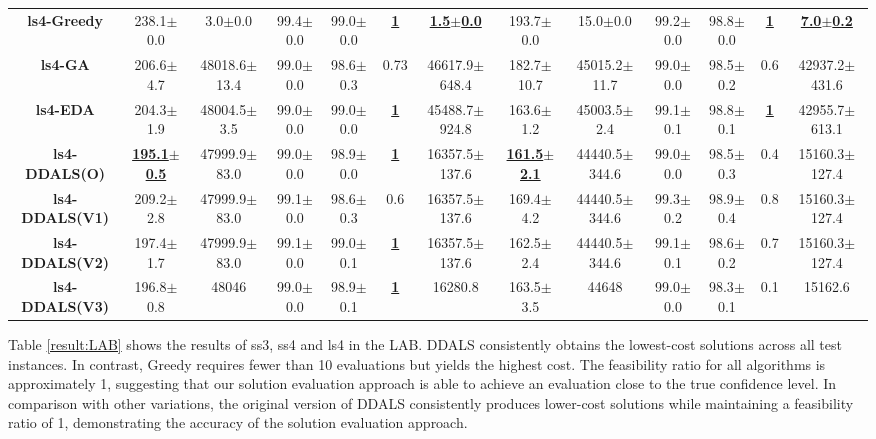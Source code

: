 \documentclass[lettersize,journal]{IEEEtran}
\begin{document}
\begin{table}[!t]
{\begin{tabular}{ccccccccccccc}
        \midrule
        {\bfseries ls4-Greedy} &238.1$\pm$0.0 &3.0$\pm$0.0 & 99.4$\pm$0.0 &99.0$\pm$0.0 &\underline{\bfseries 1} &\underline{\bfseries 1.5$\pm$0.0} &193.7$\pm$0.0 &15.0$\pm$0.0& 99.2$\pm$0.0&98.8$\pm$0.0  &\underline{\bfseries 1} &\underline{\bfseries 7.0$\pm$0.2} \\
        {\bfseries ls4-GA} &206.6$\pm$4.7 &48018.6$\pm$13.4 & 99.0$\pm$0.0 &98.6$\pm$0.3 &0.73 &46617.9$\pm$648.4 &182.7$\pm$10.7 &45015.2$\pm$11.7 & 99.0$\pm$0.0 &98.5$\pm$0.2 &0.6 &42937.2$\pm$431.6 \\
        {\bfseries ls4-EDA} &204.3$\pm$1.9 &48004.5$\pm$3.5 & 99.0$\pm$0.0 &99.0$\pm$0.0 &\underline{\bfseries 1} &45488.7$\pm$924.8 &163.6$\pm$1.2 &45003.5$\pm$2.4 & 99.1$\pm$0.1 &98.8$\pm$0.1  &\underline{\bfseries 1} &42955.7$\pm$613.1 \\
        {\bfseries ls4-DDALS(O)} &\underline{\bfseries 195.1$\pm$0.5} &47999.9$\pm$83.0 &99.0$\pm$0.0 &98.9$\pm$0.0 &\underline{\bfseries 1} &16357.5$\pm$137.6 &\underline{\bfseries 161.5$\pm$2.1} &44440.5$\pm$344.6 & 99.0$\pm$0.0 &98.5$\pm$0.3  &0.4 &15160.3$\pm$127.4 \\
        {\bfseries ls4-DDALS(V1)} &209.2$\pm$2.8 &47999.9$\pm$83.0 &99.1$\pm$0.0 &98.6$\pm$0.3 &0.6 &16357.5$\pm$137.6 &169.4$\pm$4.2 &44440.5$\pm$344.6 & 99.3$\pm$0.2 &98.9$\pm$0.4  &0.8 &15160.3$\pm$127.4 \\
        {\bfseries ls4-DDALS(V2)} &197.4$\pm$1.7 &47999.9$\pm$83.0 & 99.1$\pm$0.0 &99.0$\pm$0.1 &\underline{\bfseries 1} &16357.5$\pm$137.6 &162.5$\pm$2.4 &44440.5$\pm$344.6 & 99.1$\pm$0.1 &98.6$\pm$0.2  &0.7 &15160.3$\pm$127.4 \\
        {\bfseries ls4-DDALS(V3)} &196.8$\pm$0.8 &48046 & 99.0$\pm$0.0 &98.9$\pm$0.1 &\underline{\bfseries 1} &16280.8 &163.5$\pm$3.5 &44648 & 99.0$\pm$0.0& 98.3$\pm$0.1  &0.1 &15162.6 \\
        
        \bottomrule
        \end{tabular}
    }
    \label{result:APP}
\end{table}

Table \ref{result:LAB} shows the results of ss3, ss4 and ls4 in the LAB. 
DDALS consistently obtains the lowest-cost solutions across all test instances. 
In contrast, Greedy requires fewer than 10 evaluations but yields the highest cost. 
The feasibility ratio for all algorithms is approximately 1, suggesting that our solution evaluation approach is able to achieve an evaluation close to the true confidence level.
In comparison with other variations, the original version of DDALS consistently produces lower-cost solutions while maintaining a feasibility ratio of 1, demonstrating the accuracy of the solution evaluation approach.
\end{document}
